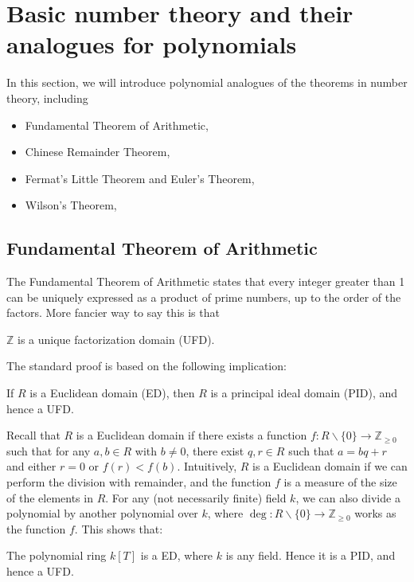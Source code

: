 \section{Basic number theory and their analogues for polynomials}
\label{sec:basicnt}

In this section, we will introduce polynomial analogues of the theorems in number theory, including
\begin{itemize}
    \item Fundamental Theorem of Arithmetic,
    \item Chinese Remainder Theorem,
    \item Fermat's Little Theorem and Euler's Theorem,
    \item Wilson's Theorem,
\end{itemize}


\subsection{Fundamental Theorem of Arithmetic}
\label{subsec:basicnt_fta}

The Fundamental Theorem of Arithmetic states that every integer greater than 1 can be uniquely expressed as a product of prime numbers, up to the order of the factors.
More fancier way to say this is that

\begin{theorem}
    \label{thm:fta}
    $\mathbb{Z}$ is a unique factorization domain (UFD).
\end{theorem}
The standard proof is based on the following implication:
\begin{theorem}
    If $R$ is a Euclidean domain (ED), then $R$ is a principal ideal domain (PID), and hence a UFD.
\end{theorem}
Recall that $R$ is a Euclidean domain if there exists a function $f : R \backslash \{0\} \to \mathbb{Z}_{\geq 0}$ such that for any $a, b \in R$ with $b \neq 0$, there exist $q, r \in R$ such that $a = bq + r$ and either $r = 0$ or $f(r) < f(b)$.
Intuitively, $R$ is a Euclidean domain if we can perform the division with remainder, and the function $f$ is a measure of the size of the elements in $R$.
For any (not necessarily finite) field $k$, we can also divide a polynomial by another polynomial over $k$, where $\deg : R \backslash \{0\} \to \mathbb{Z}_{\geq 0}$ works as the function $f$.
This shows that:
\begin{theorem}
    \label{thm:polynomial_fta}
    The polynomial ring $k[T]$ is a ED, where $k$ is any field.
    Hence it is a PID, and hence a UFD.
\end{theorem}

